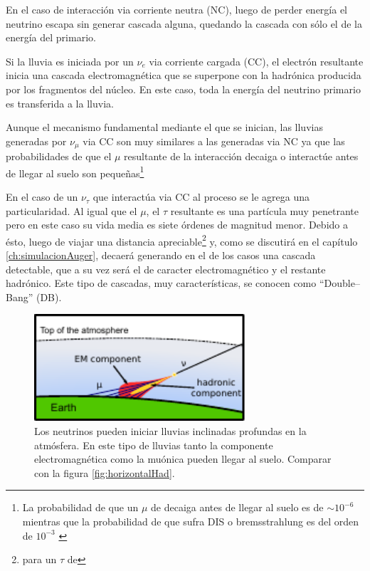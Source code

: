 En el caso de interacción via corriente neutra (NC), luego de perder energía el neutrino escapa sin generar cascada alguna, quedando la cascada con sólo el  de la energía del primario.

Si la lluvia es iniciada por un $\nu_e$ via corriente cargada (CC), el electrón resultante inicia una cascada electromagnética que se superpone con la hadrónica producida por los fragmentos del núcleo.
En este caso, toda la energía del neutrino primario es transferida a la lluvia.

Aunque el mecanismo fundamental mediante el que se inician, las lluvias generadas por $\nu_{\mu}$ via CC son muy similares a las generadas via NC ya que las probabilidades de que el $\mu$ resultante de la interacción decaiga o interactúe antes de llegar al suelo son pequeñas\footnote{La probabilidad de que un $\mu$ de  decaiga antes de llegar al suelo es de $\sim10^{-6}$ mientras que la probabilidad de que sufra DIS o bremsstrahlung es del orden de $10^{-3}$ \cite{cite:tesisJavier}} 

En el caso de un $\nu_{\tau}$ que interactúa via CC al proceso se le agrega una particularidad.
Al igual que el $\mu$, el $\tau$ resultante es una partícula muy penetrante pero en este caso su vida media es siete \'ordenes de magnitud menor.
Debido a \'esto, luego de viajar una distancia apreciable\footnote{ para un $\tau$ de } y, como se discutir\'a en el cap\'itulo \ref{ch:simulacionAuger}, decaerá generando en el  de los casos una cascada detectable, que a su vez será el  de caracter electromagnético y el  restante hadrónico.
Este tipo de cascadas, muy características, se conocen como ``Double--Bang'' (DB).
%
\begin{figure}[h!]
\begin{center}
\includegraphics[width=0.7\textwidth]{fig/EASAuger/horizontal_deep_english.pdf}
\caption{Los neutrinos pueden iniciar lluvias inclinadas profundas en la atmósfera.
En este tipo de lluvias tanto la componente electromagnética como la muónica pueden llegar al suelo.
Comparar con la figura \ref{fig:horizontalHad}.
}
\label{fig:horizontalNu}
\end{center}
\end{figure}

